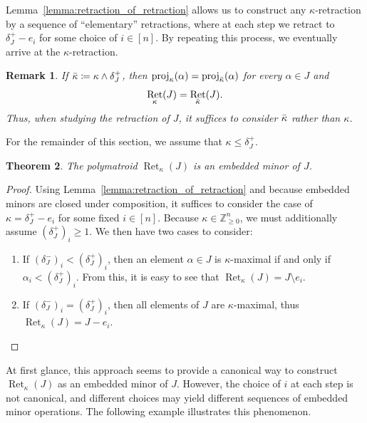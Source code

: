 \documentclass[10pt,a4paper]{amsart}
\newtheorem{theorem}{Theorem}[section]
\newtheorem{remark}[theorem]{Remark}
\newcommand{\Zgeqn}{\mathbb{Z}_{\geq 0}^n}     %
\newcommand{\delplus}{\delta_J^+}
\newcommand{\delminus}{\delta_J^-}
\DeclareMathOperator{\proj}{proj}              %
\newcommand{\kproj}{\proj_{\kappa}}            %
\DeclareMathOperator{\Ret}{Ret}                %
\newcommand{\RetK}{\Ret_{\kappa}}              %
\begin{document}
Lemma~\ref{lemma:retraction_of_retraction} allows us to construct any $\kappa$-retraction by a sequence of ``elementary'' retractions, where at each step we retract to $\delplus - e_i$ for some choice of $i \in [n]$. By repeating this process, we eventually arrive at the $\kappa$-retraction.

\begin{remark}\label{remark:kappa_smaller_than_delplus}
    If $\Bar{\kappa}\coloneqq\kappa\wedge\delplus$, then
    $\kproj(\alpha)=\proj_{\Bar{\kappa}}(\alpha)$ for every $\alpha\in J$ and
    \[
        \RetK(J)=\Ret_{\Bar{\kappa}}(J).
    \]
    Thus, when studying the retraction of $J$, it suffices to consider
    $\Bar{\kappa}$ rather than $\kappa$.
\end{remark}

For the remainder of this section, we assume that $\kappa\leq\delplus$.

\begin{theorem} \label{theorem:retraction_is_embedded_minor}
    The polymatroid $\RetK(J)$ is an embedded minor of $J$.
\end{theorem}
\begin{proof}
    Using Lemma~\ref{lemma:retraction_of_retraction} and because embedded minors are closed under composition, it suffices to consider the case of $\kappa = \delplus - e_i$ for some fixed $i \in [n]$. Because $\kappa \in \Zgeqn$, we must additionally assume $(\delplus)_i \geq 1$. We then have two cases to consider:
    \begin{enumerate}[label=\textit{Case \arabic*:}, leftmargin=*, align=left]
        \item If $(\delminus)_i < (\delplus)_i$, then an element $\alpha \in J$ is $\kappa$-maximal if and only if $\alpha_i < (\delplus)_i$. From this, it is easy to see that $\RetK(J) = J \setminus e_i$.
        \item If $(\delminus)_i = (\delplus)_i$, then all elements of $J$ are $\kappa$-maximal, thus $\RetK(J) = J - e_i$.
    \end{enumerate}
\end{proof}
At first glance, this approach seems to provide a canonical way to construct $\RetK(J)$ as an embedded minor of $J$. However, the choice of $i$ at each step is not canonical, and different choices may yield different sequences of embedded minor operations. The following example illustrates this phenomenon.
\end{document}
